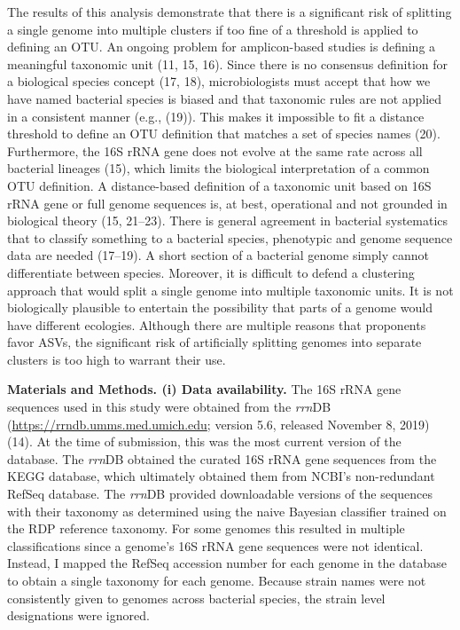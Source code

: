 \documentclass[
]{article}
\begin{document}
The results of this analysis demonstrate that there is a significant
risk of splitting a single genome into multiple clusters if too fine of
a threshold is applied to defining an OTU. An ongoing problem for
amplicon-based studies is defining a meaningful taxonomic unit (11, 15,
16). Since there is no consensus definition for a biological species
concept (17, 18), microbiologists must accept that how we have named
bacterial species is biased and that taxonomic rules are not applied in
a consistent manner (e.g., (19)). This makes it impossible to fit a
distance threshold to define an OTU definition that matches a set of
species names (20). Furthermore, the 16S rRNA gene does not evolve at
the same rate across all bacterial lineages (15), which limits the
biological interpretation of a common OTU definition. A distance-based
definition of a taxonomic unit based on 16S rRNA gene or full genome
sequences is, at best, operational and not grounded in biological theory
(15, 21--23). There is general agreement in bacterial systematics that
to classify something to a bacterial species, phenotypic and genome
sequence data are needed (17--19). A short section of a bacterial genome
simply cannot differentiate between species. Moreover, it is difficult
to defend a clustering approach that would split a single genome into
multiple taxonomic units. It is not biologically plausible to entertain
the possibility that parts of a genome would have different ecologies.
Although there are multiple reasons that proponents favor ASVs, the
significant risk of artificially splitting genomes into separate
clusters is too high to warrant their use.

\textbf{Materials and Methods. (i) Data availability.} The 16S rRNA gene
sequences used in this study were obtained from the \emph{rrn}DB
(\url{https://rrndb.umms.med.umich.edu}; version 5.6, released November
8, 2019) (14). At the time of submission, this was the most current
version of the database. The \emph{rrn}DB obtained the curated 16S rRNA
gene sequences from the KEGG database, which ultimately obtained them
from NCBI's non-redundant RefSeq database. The \emph{rrn}DB provided
downloadable versions of the sequences with their taxonomy as determined
using the naive Bayesian classifier trained on the RDP reference
taxonomy. For some genomes this resulted in multiple classifications
since a genome's 16S rRNA gene sequences were not identical. Instead, I
mapped the RefSeq accession number for each genome in the database to
obtain a single taxonomy for each genome. Because strain names were not
consistently given to genomes across bacterial species, the strain level
designations were ignored.
\end{document}
